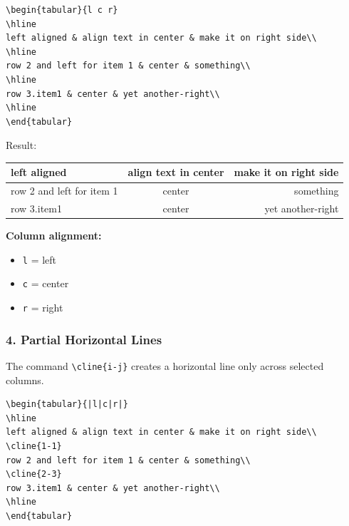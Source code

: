 \documentclass[a4paper,10pt]{article}
\begin{document}
\begin{verbatim}
\begin{tabular}{l c r}
\hline
left aligned & align text in center & make it on right side\\
\hline
row 2 and left for item 1 & center & something\\
\hline
row 3.item1 & center & yet another-right\\
\hline
\end{tabular}
\end{verbatim}

Result:

\begin{center}
\begin{tabular}{l c r}
\hline
left aligned & align text in center & make it on right side\\
\hline
row 2 and left for item 1 & center & something\\
\hline
row 3.item1 & center & yet another-right\\
\hline
\end{tabular}
\end{center}

\textbf{Column alignment:}

\begin{itemize}
    \item \texttt{l} = left
    \item \texttt{c} = center
    \item \texttt{r} = right
\end{itemize}


\subsubsection{4. Partial Horizontal Lines}

The command \texttt{\textbackslash cline\{i-j\}} creates a horizontal
line only across selected columns.

\begin{verbatim}
\begin{tabular}{|l|c|r|}
\hline
left aligned & align text in center & make it on right side\\
\cline{1-1}
row 2 and left for item 1 & center & something\\
\cline{2-3}
row 3.item1 & center & yet another-right\\
\hline
\end{tabular}
\end{verbatim}
\end{document}

